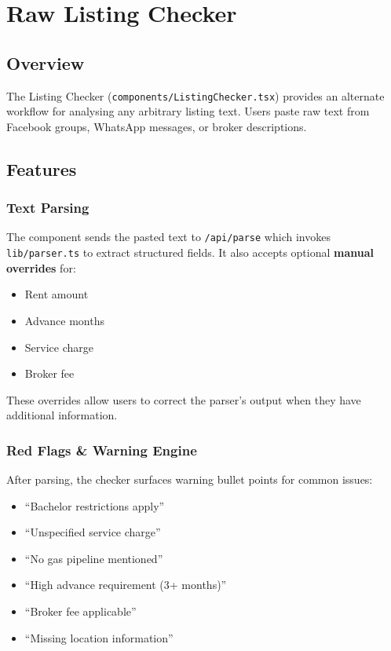 \documentclass[12pt, a4paper, oneside]{report}
\newcommand{\filepath}[1]{\texttt{\small\color{codeblue}#1}}
\newcommand{\apiendpoint}[1]{\texttt{\small\color{primary}#1}}
\begin{document}
\chapter{Raw Listing Checker}

\section{Overview}

The Listing Checker (\filepath{components/ListingChecker.tsx}) provides an alternate workflow for analysing any arbitrary listing text. Users paste raw text from Facebook groups, WhatsApp messages, or broker descriptions.

\section{Features}

\subsection{Text Parsing}

The component sends the pasted text to \apiendpoint{/api/parse} which invokes \filepath{lib/parser.ts} to extract structured fields. It also accepts optional \textbf{manual overrides} for:

\begin{itemize}[leftmargin=2em]
  \item Rent amount
  \item Advance months
  \item Service charge
  \item Broker fee
\end{itemize}

These overrides allow users to correct the parser's output when they have additional information.

\subsection{Red Flags \& Warning Engine}

After parsing, the checker surfaces warning bullet points for common issues:

\begin{itemize}[leftmargin=2em]
  \item ``Bachelor restrictions apply''
  \item ``Unspecified service charge''
  \item ``No gas pipeline mentioned''
  \item ``High advance requirement (3+ months)''
  \item ``Broker fee applicable''
  \item ``Missing location information''
\end{itemize}
\end{document}
